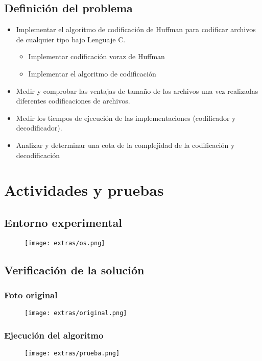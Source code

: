 \documentclass[12 pt]{report}
\begin{document}
\section{Definición del problema}
\begin{itemize}
\item Implementar el algoritmo de codificación de Huffman para codificar archivos de cualquier tipo bajo Lenguaje C.
  \begin{itemize}
  \item Implementar codificación voraz de Huffman
  \item Implementar el algoritmo de codificación
  \end{itemize}
  
\item Medir y comprobar las ventajas de tamaño de los archivos una vez realizadas diferentes codificaciones de archivos.
\item Medir los tiempos de ejecución de las implementaciones (codificador y decodificador).
\item Analizar y determinar una cota de la complejidad de la codificación y decodificación  
\end{itemize}


\chapter{Actividades y pruebas}
\section{Entorno experimental}
\begin{figure}[ht]
  \centering
  \texttt{[image: extras/os.png]}
  \caption{\label{Entorno experimental usado} }
\end{figure}
\newpage




\section{Verificación de la solución}
\subsection{Foto original}
\begin{figure}[ht]
  \centering
  \texttt{[image: extras/original.png]}
  \caption{\label{fig:Original} }
\end{figure}
\subsection{Ejecución del algoritmo}
\begin{figure}[ht]
  \centering
  \texttt{[image: extras/prueba.png]}
  \caption{\label{fig:Ejecución} }
\end{figure}
\newpage
\end{document}

